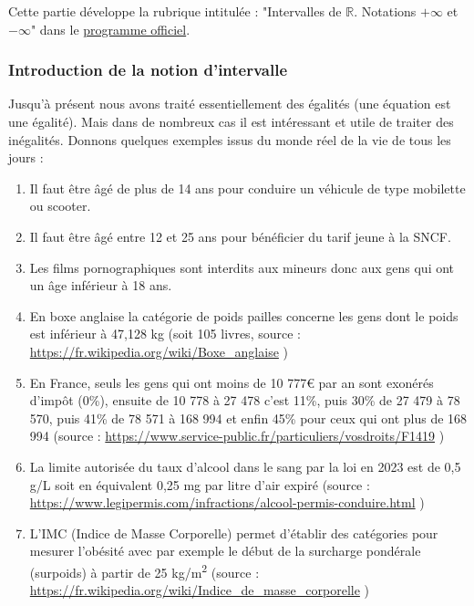 \documentclass[a4paper, 11pt, twoside]{article}
\newcommand{\R}{\mathbb{R}}
\begin{document}
\startcontents[level-2]

Cette partie développe la rubrique intitulée : "Intervalles de
\(\R\). Notations \(+\infty\) et \(-\infty\)" dans le \href{https://eduscol.education.fr/document/24553/download}{programme officiel}.

\subsubsection{Introduction de la notion d'intervalle}
\label{sec:orgd58e5f9}

Jusqu'à présent nous avons traité essentiellement des égalités (une
équation est une égalité). Mais dans de nombreux cas il est
intéressant et utile de traiter des inégalités. Donnons quelques
exemples issus du monde réel de la vie de tous les jours :
\begin{enumerate}
\item Il faut être âgé de plus de 14 ans pour conduire un véhicule de
type mobilette ou scooter.
\item Il faut être âgé entre 12 et 25 ans pour bénéficier du tarif
jeune à la SNCF.
\item Les films pornographiques sont interdits aux mineurs donc aux
gens qui ont un âge inférieur à 18 ans.
\item En boxe anglaise la catégorie de poids pailles concerne les gens
dont le poids est inférieur à 47,128 kg (soit 105 livres, source :
\url{https://fr.wikipedia.org/wiki/Boxe\_anglaise} )
\item En France, seuls les gens qui ont moins de 10 777€ par an sont
exonérés d'impôt (0\%), ensuite de 10 778 à 27 478 c'est 11\%,
puis 30\% de 27 479 à 78 570, puis 41\% de 78 571 à 168 994 et
enfin 45\% pour ceux qui ont plus de 168 994 (source :
\url{https://www.service-public.fr/particuliers/vosdroits/F1419} )
\item La limite autorisée du taux d'alcool dans le sang par la loi en
2023 est de 0,5 g/L soit en équivalent 0,25 mg par litre d'air
expiré (source :
\url{https://www.legipermis.com/infractions/alcool-permis-conduire.html}
)
\item L'IMC (Indice de Masse Corporelle) permet d'établir des
catégories pour mesurer l'obésité avec par exemple le début de la
surcharge pondérale (surpoids) à partir de 25 kg/m\textsuperscript{2} (source :
\url{https://fr.wikipedia.org/wiki/Indice\_de\_masse\_corporelle} )
\end{enumerate}
\end{document}
